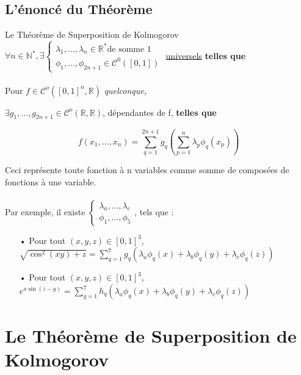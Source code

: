 \documentclass[8pt,a9paper]{beamer} \usepackage[utf8]{inputenc} \usepackage[francais]{babel} \usepackage[T1]{fontenc}
\begin{document}
\subsection{L'énoncé du Théorème} %
\begin{frame}
	\begin{block}{Le Théorème de Superposition de Kolmogorov}
	$ \forall n \in \mathbb{N}^* , \exists \left\lbrace \begin{array}{l} \lambda_1 ,…, \lambda_n \in \mathbb{R}^* \text{de somme 1}\\ \phi_1,…, \phi_{2n+1} \in \mathcal{C}^0([0,1])\end{array} \right. $ \underline{universels} \textbf{telles que}\\
	\textbf{\\}
	Pour $ f \in \mathcal{C}^o([0,1]^n, \mathbb{R})$ \emph{quelconque},\\
	\begin{center} $\exists g_1,…,g_{2n+1}\in \mathcal{C}^o (\mathbb{R},\mathbb{R})$, dépendantes de f, \textbf{telles que} \end{center}
	\[f(x_1,…,x_n)= \sum\limits_{q=1}^{2n+1} g_q\left(\sum\limits_{p=1}^{n}\lambda_p\phi_q(x_p)\right) \]
	\end{block}
	Ceci représente toute fonction à n variables comme somme de composées de fonctions à une variable.\\
	\textbf{\\}
	Par exemple, il existe $\left\lbrace \begin{array}{l} \lambda_a ,…, \lambda_c \\ \phi_1,…,\phi_5 \end{array} \right.$, tels que : \begin{itemize}
	\item[•] Pour tout $(x,y,z) \in [0,1]^3$, $\sqrt{\cos^2(xy)+z} = \sum\limits_{q=1}^{7} g_q\left(\lambda_a\phi_q(x)+\lambda_b\phi_q(y)+\lambda_c\phi_q(z) \right)$
	\item[•] Pour tout $(x,y,z) \in [0,1]^3$, $e^{x\sin(z-y)} = \sum\limits_{q=1}^{7} h_q\left(\lambda_a\phi_q(x)+\lambda_b\phi_q(y)+\lambda_c\phi_q(z)\right)$
	\end{itemize}
\end{frame}
\section{Le Théorème de Superposition de Kolmogorov}
\end{document}

